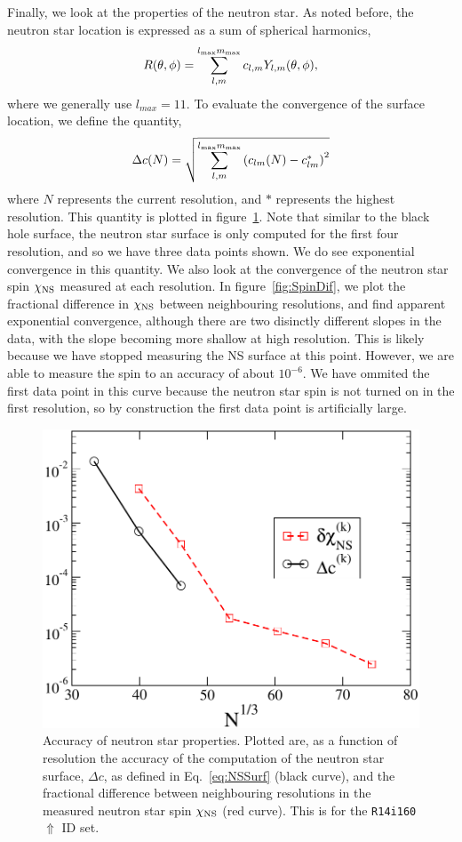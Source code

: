 Finally, we look at the properties of the neutron star. As noted before,
the neutron star location is expressed as a sum of spherical
harmonics,
\begin{equation}
R(\theta,\phi)=\sum^{l_{\rm max}m_{\rm max}}_{l,m}c_{l,m}Y_{l,m}(\theta,\phi),
\end{equation}
where we generally use $l_{max}=11$.
To evaluate the convergence of the surface location, we define the
quantity,
\begin{equation}
\label{eq:NSSurf}
\Delta c(N)=\sqrt{\sum_{l,m}^{l_{\rm max}m_{\rm max}}\left(c_{lm}(N)-c^{*}_{lm}\right)^2}
\end{equation}
where $N$ represents the current resolution, and $*$ represents the
highest resolution. This quantity is plotted in
figure~\ref{fig:SpinDiff}. Note that similar to the black hole surface, the
neutron star surface is only computed for the first four resolution,
and so we have three data points shown. We do see exponential
convergence in this quantity. We also look at the convergence of the
neutron star spin $\chi_{\rm NS}$ measured at each resolution. In
figure~\ref{fig:SpinDif}, we plot the fractional difference in
$\chi_{\rm NS}$ between neighbouring resolutions, and find apparent
exponential convergence, although there are two disinctly different
slopes in the data, with the slope becoming more shallow at high
resolution. This is likely because we have stopped measuring the NS
surface at this point. However, we are able to measure the spin to an
accuracy of about $10^{-6}$. 
 We have ommited the first data point in this curve
because the neutron star spin is not turned on in the first
resolution, so by construction the first data point is artificially large.

\begin{figure}
\includegraphics[width=0.95\columnwidth]{chap4/SpinDiff}
\caption[Neutron star surface and spin accuracy.]{\label{fig:SpinDiff}
  Accuracy of neutron star properties. Plotted are, as a function of resolution the accuracy of the computation of the neutron star
  surface, $\Delta c$, as defined in Eq.~\ref{eq:NSSurf} (black
  curve), and the fractional difference between neighbouring
  resolutions in the measured neutron star spin $\chi_{\rm NS}$ (red
  curve). This is for the {\tt R14i160$\Uparrow$} ID set.}
\end{figure}

